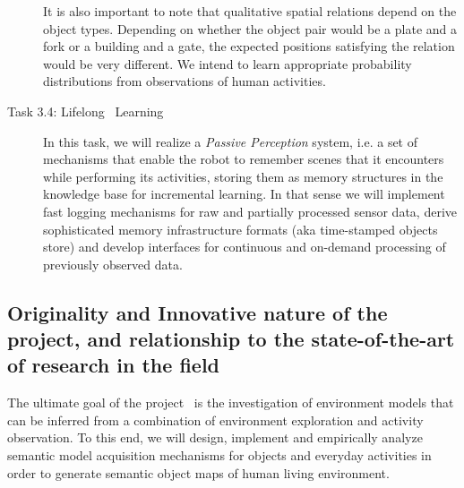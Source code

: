 \begin{description}
  It is also important to note that qualitative spatial relations
  depend on the object types. Depending on whether the
  object pair would be a plate and a fork or a building and a gate,
  the expected positions satisfying the relation would be very
  different. We intend to learn appropriate probability distributions
  from observations of human activities.

\item[Task 3.4: Lifelong \ksem\ Learning]
  In this task, we will realize a 
  \emph{Passive Perception} system, i.e. a set of mechanisms that enable the robot to 
  remember scenes that it encounters while performing its activities, storing them 
  as memory structures in the knowledge base for incremental learning. In that sense we will implement fast 
  logging mechanisms for raw and partially processed sensor data, derive
  sophisticated memory infrastructure formats (aka time-stamped objects store) 
  and develop interfaces for continuous and on-demand processing of previously observed data.
\end{description}
\subsection{Originality and Innovative nature of the project, and relationship to the state-of-the-art of 
research in the field}
The ultimate goal of the project \ksem\ is the investigation of 
environment models that can be inferred from a combination of 
environment exploration and activity observation. To this end, we 
will design, implement and empirically analyze semantic model 
acquisition mechanisms for objects and everyday activities in order 
to generate semantic object maps of human living environment.


